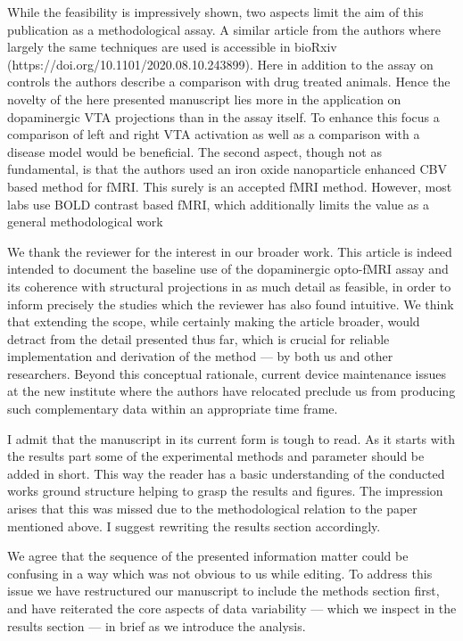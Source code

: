 \reviewersection

\setcounter{point}{-1}

\begin{point}
	While the feasibility is impressively shown, two aspects limit the aim of this publication as a methodological assay. A similar article from the authors where largely the same techniques are used is accessible in bioRxiv (https://doi.org/10.1101/2020.08.10.243899). Here in addition
to the assay on controls the authors describe a comparison with drug treated animals. Hence the novelty of the here presented manuscript lies more in the application on dopaminergic VTA projections than in the assay itself. To enhance this focus a comparison of left and right VTA
activation as well as a comparison with a disease model would be beneficial. The second aspect, though not as fundamental, is that the authors used an iron oxide nanoparticle enhanced CBV based method for fMRI. This surely is an accepted fMRI method. However, most labs use BOLD
contrast based fMRI, which additionally limits the value as a general methodological work
\end{point}
\begin{reply}
	We thank the reviewer for the interest in our broader work.
	This article is indeed intended to document the baseline use of the dopaminergic opto-fMRI assay and its coherence with structural projections in as much detail as feasible, in order to inform precisely the studies which the reviewer has also found intuitive.
	We think that extending the scope, while certainly making the article broader, would detract from the detail presented thus far, which is crucial for reliable implementation and derivation of the method --- by both us and other researchers.
	Beyond this conceptual rationale, current device maintenance issues at the new institute where the authors have relocated preclude us from producing such complementary data within an appropriate time frame.
\end{reply}

\begin{point}
	I admit that the manuscript in its current form is tough to read. As it starts with the results part some of the experimental methods and parameter should be added in short. This way the reader has a basic understanding of the conducted works ground structure helping to grasp the
results and figures. The impression arises that this was missed due to the methodological relation to the paper mentioned above. I suggest rewriting the results section accordingly.
\end{point}
\begin{reply}
	We agree that the sequence of the presented information matter could be confusing in a way which was not obvious to us while editing.
	To address this issue we have restructured our manuscript to include the methods section first, and have reiterated the core aspects of data variability --- which we inspect in the results section --- in brief as we introduce the analysis.
\end{reply}

